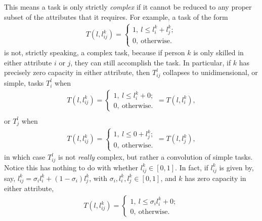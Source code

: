 {\begin{definition}
        This means a task is only strictly \textit{complex} if it cannot be reduced to any proper subset of the attributes that it requires. For example, a task of the form
        \begin{gather}
            T(l, l_{ij}^{k}) =
            \begin{cases}
                1, \ l \leq l_{i}^{k} + l_{j}^{k}; \\
                0, \ \text{otherwise.}
            \end{cases}
        \end{gather}
        is not, strictly speaking, a complex task, because if person $k$ is only skilled in either attribute $i$ or $j$, they can still accomplish the task. In particular, if $k$ has precisely zero capacity in either attribute, then $T_{ij}^{l}$ collapses to unidimensional, or simple, tasks $T_{i}^{l}$ when
        \begin{gather}
            T(l, l_{ij}^{k}) =
            \begin{cases}
                1, \ l \leq l_{i}^{k} + 0; \\
                0, \ \text{otherwise.}
            \end{cases}
            = T(l, l_{i}^{k})
            ,\\
        \end{gather}
        or $T_{j}^{l}$ when
        \begin{gather}
            T(l, l_{ij}^{k}) =
            \begin{cases}
                1, \ l \leq 0 + l_{j}^{k}; \\
                0, \ \text{otherwise.}
            \end{cases}
            = T(l, l_{j}^{k})
            ,
        \end{gather}
        in which case $T_{ij}^{l}$ is not \textit{really} complex, but rather a convolution of simple tasks. Notice this has nothing to do with whether $l_{ij}^{k} \in [0,1]$. In fact, if $l_{ij}^{k}$ is given by, say, $l_{ij}^{k} = \sigma_{i} l_{i}^{k} + (1 - \sigma_{i})l_{j}^{k}$, with $\sigma_{i}, l_{i}^{k}, l_{j}^{k} \in [0,1]$, and $k$ has zero capacity in either attribute,
        \begin{gather}
            T(l, l_{ij}^{k}) =
            \begin{cases}
                1, \ l \leq \sigma_{i} l_{i}^{k} + 0; \\
                0, \ \text{otherwise.}
            \end{cases}

\end{gather}
\end{definition}}
